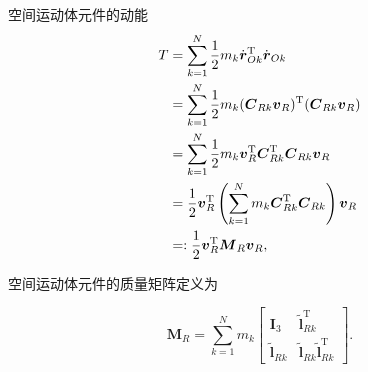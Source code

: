 空间运动体元件的动能
\begin{align*}T &= \sum_{k=1}^{N} \frac{1}{2} m_k \dot{\boldsymbol{r}}_{Ok}^{\mathrm{T}} \dot{\boldsymbol{r}}_{Ok} \notag \\
&= \sum_{k=1}^{N} \frac{1}{2} m_k (\boldsymbol{C}_{Rk} \boldsymbol{v}_R)^{\mathrm{T}} (\boldsymbol{C}_{Rk} \boldsymbol{v}_R) \notag \\
&= \sum_{k=1}^{N} \frac{1}{2} m_k \boldsymbol{v}_R^{\mathrm{T}} \boldsymbol{C}_{Rk}^{\mathrm{T}} \boldsymbol{C}_{Rk} \boldsymbol{v}_R \notag \\
&= \frac{1}{2} \boldsymbol{v}_R^{\mathrm{T}} \left( \sum_{k=1}^{N} m_k \boldsymbol{C}_{Rk}^{\mathrm{T}} \boldsymbol{C}_{Rk} \right) \boldsymbol{v}_R \notag \\
&=: \frac{1}{2} \boldsymbol{v}_R^{\mathrm{T}} \boldsymbol{M}_R \boldsymbol{v}_R,\end{align*}
\begin{definition}[定义 8.1（体元件的质量矩阵）]
空间运动体元件的质量矩阵定义为

\[
\boldsymbol{M}_R = \sum_{k=1}^{N} m_k \begin{bmatrix} \boldsymbol{I}_3 & \tilde{\boldsymbol{l}}_{Rk}^{\mathrm{T}} \\ \tilde{\boldsymbol{l}}_{Rk} & \tilde{\boldsymbol{l}}_{Rk} \tilde{\boldsymbol{l}}_{Rk}^{\mathrm{T}} \end{bmatrix}.
\]
\end{definition}
